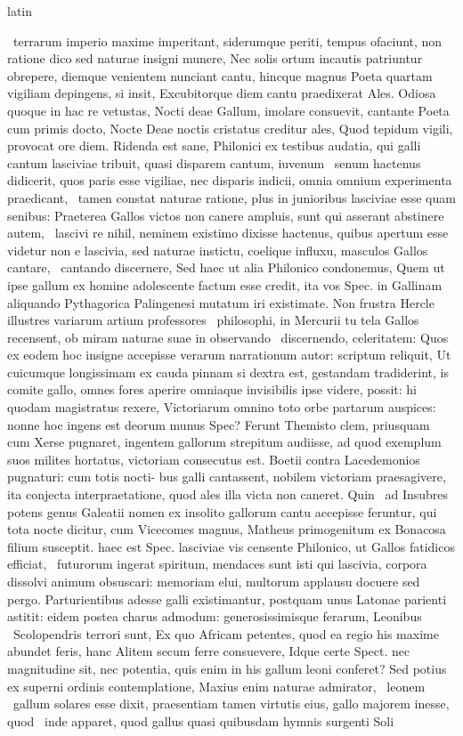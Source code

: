 \documentclass[12pt]{book}
\renewenvironment{latin}
    	{\begin{hyphenrules}{latin}}
    	{\end{hyphenrules}}
\begin{document}
\begin{pages}
\begin{latin}
\begin{Leftside}
﻿\ampersand\ terrarum imperio maxime imperitant, siderumque periti, tempus ofaciunt, non ratione dico sed naturae insigni munere, Nec solis ortum incautis patriuntur obrepere, diemque venientem nunciant cantu, hincque magnus Poeta quartam vigiliam depingens, si insit, Excubitorque diem cantu praedixerat Ales. Odiosa quoque in hac re vetustas, Nocti deae Gallum, imolare consuevit, cantante Poeta cum primis docto, Nocte Deae noctis cristatus creditur ales, Quod tepidum vigili, provocat ore diem. Ridenda est sane, Philonici ex testibus audatia, qui galli cantum lasciviae tribuit, quasi disparem cantum, iuvenum ﻿\ampersand\ senum hactenus didicerit, quos paris esse vigiliae, nec disparis indicii, omnia omnium experimenta praedicant, ﻿\ampersand\ tamen constat naturae ratione, plus in junioribus lasciviae esse quam senibus: Praeterea Gallos victos non canere ampluis, sunt qui asserant abstinere autem, ﻿\ampersand\ lascivi re nihil, neminem existimo dixisse hactenus, quibus apertum esse videtur non e lascivia, sed naturae instictu, coelique influxu, masculos Gallos cantare, ﻿\ampersand\ cantando discernere, Sed haec ut alia Philonico condonemus, Quem ut ipse gallum ex homine adolescente factum esse credit, ita vos Spec. in Gallinam aliquando Pythagorica Palingenesi mutatum iri existimate. Non frustra Hercle illustres variarum artium professores ﻿\ampersand\ philosophi, in Mercurii tu tela Gallos recensent, ob miram naturae suae in observando ﻿\ampersand\ discernendo, celeritatem: Quos ex eodem hoc insigne accepisse verarum narrationum autor: scriptum reliquit, Ut cuicumque longissimam ex cauda pinnam si dextra est, gestandam tradiderint, is comite gallo, omnes fores aperire omniaque invisibilis ipse videre, possit: hi quodam magistratus rexere, Victoriarum omnino toto orbe partarum auspices: nonne hoc ingens est deorum munus Spec? Ferunt Themisto   clem, priusquam cum Xerse pugnaret, ingentem gallorum strepitum audiisse, ad quod exemplum suos milites hortatus, victoriam consecutus est. Boetii contra Lacedemonios pugnaturi: cum totis nocti- bus galli cantassent, nobilem victoriam praesagivere, ita conjecta interpraetatione, quod ales illa victa non caneret. Quin ﻿\ampersand\ ad Insubres potens genus Galeatii nomen ex insolito gallorum cantu accepisse feruntur, qui tota nocte dicitur, cum Vicecomes magnus, Matheus primogenitum ex Bonacosa filium susceptit. haec est Spec. lasciviae vis censente Philonico, ut Gallos fatidicos efficiat, ﻿\ampersand\ futurorum ingerat spiritum, mendaces sunt isti qui lascivia, corpora dissolvi animum obsuscari: memoriam elui, multorum applausu docuere sed pergo. Parturientibus adesse galli existimantur, postquam unus Latonae parienti astitit: eidem postea charus admodum: generosissimisque ferarum, Leonibus ﻿\ampersand\ Scolopendris terrori sunt, Ex quo Africam petentes, quod ea regio his maxime abundet feris, hanc Alitem secum ferre consuevere, Idque certe Spect. nec magnitudine sit, nec potentia, quis enim in his gallum leoni conferet? Sed potius ex superni ordinis contemplatione, Maxius enim naturae admirator, ﻿\ampersand\ leonem ﻿\ampersand\ gallum solares esse dixit, praesentiam tamen virtutis eius, gallo majorem inesse, quod ﻿\ampersand\ inde apparet, quod gallus quasi quibusdam hymnis surgenti Soli 
\end{Leftside}
\end{latin}
\end{pages}
\end{document}
